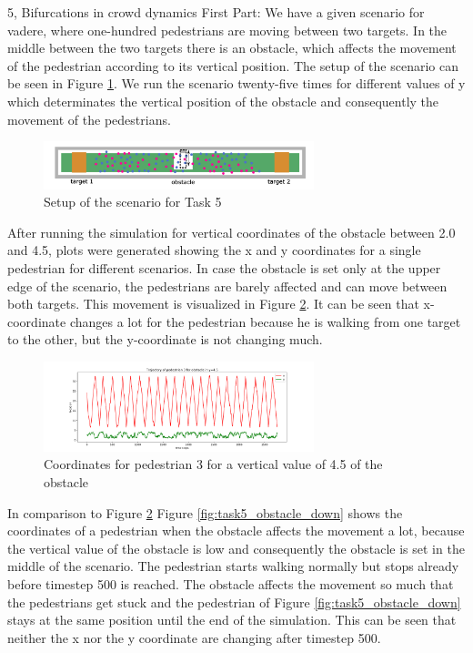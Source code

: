 \documentclass[10pt,a4paper]{article}
\begin{document}
\begin{task}{5, Bifurcations in crowd dynamics}
First Part:
We have a given scenario for vadere, where one-hundred pedestrians are moving between two targets. In the middle between the two targets there is an obstacle, which affects the movement of the pedestrian according to its vertical position. The setup of the scenario can be seen in Figure \ref{fig:task5_setup}.
We run the scenario twenty-five times for different values of y which determinates the vertical position of the obstacle and consequently the movement of the pedestrians.
\begin{figure}[H]
\centering
\includegraphics[width=0.7\textwidth]{../plots/scenario_setup.png}
\caption{Setup of the scenario for Task 5}
\label{fig:task5_setup}
\end{figure}
After running the simulation for vertical coordinates of the obstacle between 2.0 and 4.5, plots were generated showing the x and y coordinates for a single pedestrian for different scenarios. In case the obstacle is set only at the upper edge of the scenario, the pedestrians are barely affected and can move between both targets. This movement is visualized in Figure \ref{fig:task5_obstacle_up}. It can be seen that x-coordinate changes a lot for the pedestrian because he is walking from one target to the other, but the y-coordinate is not changing much.
\begin{figure}[H]
\centering
\includegraphics[width=0.7\textwidth]{../plots/task5/3_4,5.png}
\caption{Coordinates for pedestrian 3 for a vertical value of 4.5 of the obstacle}
\label{fig:task5_obstacle_up}
\end{figure}
In comparison to Figure \ref{fig:task5_obstacle_up} Figure \ref{fig:task5_obstacle_down} shows the coordinates of a pedestrian when the obstacle affects the movement a lot, because the vertical value of the obstacle is low and consequently the obstacle is set in the middle of the scenario. The pedestrian starts walking normally but stops already before timestep 500 is reached. The obstacle affects the movement so much that the pedestrians get stuck and the pedestrian of Figure \ref{fig:task5_obstacle_down} stays at the same position until the end of the simulation. This can be seen that neither the x nor the y coordinate are changing after timestep 500.

\end{task}
\end{document}
